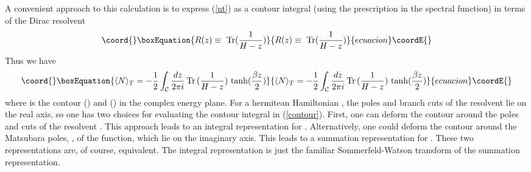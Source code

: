 \documentclass[a4paper,prd]{revtex4}
\begin{document}
A convenient approach to this calculation is to express (\ref{nt}) as a
contour integral (using the \coordHE{} prescription in the spectral
function) in terms of the Dirac resolvent
\begin{equation}\coord{}\boxEquation{
R(z)\equiv \textrm{ Tr}(\frac{1}{H-z})
\label{resolvent}
}{
R(z)\equiv \textrm{ Tr}(\frac{1}{H-z})
}{ecuacion}\coordE{}\end{equation}
Thus we have
\begin{equation}\coord{}\boxEquation{
\langle N\rangle _T =-\frac{1}{2}\int_\mathcal{C}\frac{dz}{2\pi i}\,
\textrm{Tr}\, (\frac{1}{H-z}) \,\tanh(\frac{\beta z}{2})
\label{contour}
}{
\langle N\rangle _T =-\frac{1}{2}\int_\mathcal{C}\frac{dz}{2\pi i}\,
\textrm{Tr}\, (\frac{1}{H-z}) \,\tanh(\frac{\beta z}{2})
}{ecuacion}\coordE{}\end{equation}
where \coordHE{} is the contour (\coordHE{}) and 
(\coordHE{}) in the complex energy plane. For a
hermitean Hamiltonian \coordHE{}, the poles and branch cuts of the resolvent lie on the
real axis, so one has two choices for evaluating the contour integral in
(\ref{contour}). First, one can deform the contour \coordHE{} around the poles and
cuts of the resolvent \coordHE{}. This approach leads to an integral representation for
\coordHE{}. Alternatively, one could deform the contour \coordHE{}
around the Matsubara poles, \coordHE{}, of the \coordHE{} function, which lie on the imaginary axis. This leads to a summation
representation for \coordHE{}. These two representations are, of course,
equivalent. The integral representation is just the familiar Sommerfeld-Watson
transform of the summation representation.  
\end{document}

